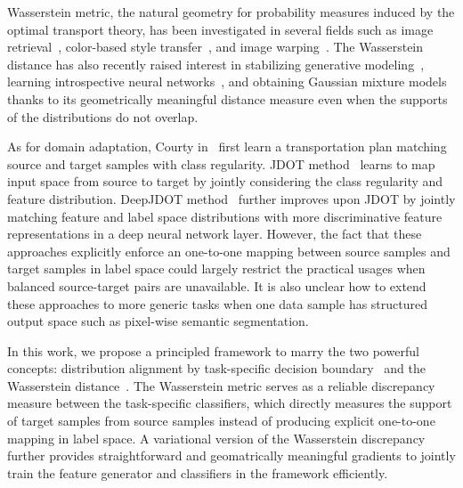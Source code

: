 \documentclass[10pt,twocolumn,letterpaper]{article}
\begin{document}
Wasserstein metric, the natural geometry for probability measures induced by the optimal transport theory, has been investigated in several fields such as image retrieval~\cite{rubner1998metric}, color-based style transfer~\cite{pitie2005n}, and image warping~\cite{haker2004optimal}. The Wasserstein distance has also recently raised interest in stabilizing generative modeling~\cite{arjovsky2017wasserstein, deshpande2018generative, wu2018wasserstein}, learning introspective neural networks~\cite{lee2018wasserstein}, and obtaining Gaussian mixture models~\cite{kolouri2017sliced} thanks to its geometrically meaningful distance measure even when the supports of the distributions do not overlap.

As for domain adaptation, Courty \etal in~\cite{courty2015optimal} first learn a transportation plan matching source and target samples with class regularity. JDOT method~\cite{courty2017joint} learns to map input space from source to target by jointly considering the class regularity and feature distribution. DeepJDOT method~\cite{damodaran2018deepjdot} further improves upon JDOT by jointly matching feature and label space distributions with more discriminative feature representations in a deep neural network layer. However, the fact that these approaches explicitly enforce an one-to-one mapping between source samples and target samples in label space could largely restrict the practical usages when balanced source-target pairs are unavailable. It is also unclear how to extend these approaches to more generic tasks when one data sample has structured output space such as pixel-wise semantic segmentation.

In this work, we propose a principled framework to marry the two powerful concepts: distribution alignment by task-specific decision boundary~\cite{saito2017maximum} and the Wasserstein distance~\cite{villani2009optimal}. The Wasserstein metric serves as a reliable discrepancy measure between the task-specific classifiers, which directly measures the support of target samples from source samples instead of producing explicit one-to-one mapping in label space. A variational version of the Wasserstein discrepancy further provides straightforward and geomatrically meaningful gradients to jointly train the feature generator and classifiers in the framework efficiently.
\end{document}
